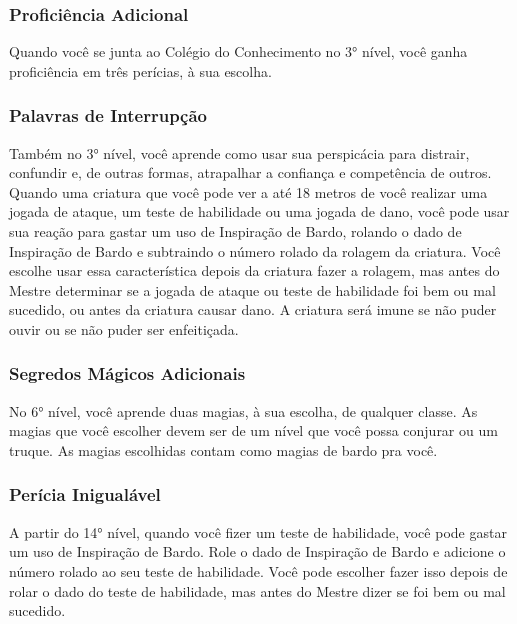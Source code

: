 \documentclass{RPG_Adventure}[2021/10/20]
\begin{document}
\subsubsection{Proficiência Adicional}%
\label{ssub:proficiencia_adicional}

Quando você se junta ao Colégio do Conhecimento no 3° nível, você ganha
proficiência em três perícias, à sua escolha.

\subsubsection{Palavras de Interrupção}%
\label{ssub:palavras_de_interrupcao}

Também no 3° nível, você aprende como usar sua perspicácia para distrair,
confundir e, de outras formas, atrapalhar a confiança e competência de outros.
Quando uma criatura que você pode ver a até 18 metros de você realizar uma
jogada de ataque, um teste de habilidade ou uma jogada de dano, você pode usar
sua reação para gastar um uso de Inspiração de Bardo, rolando o dado de
Inspiração de Bardo e subtraindo o número rolado da rolagem da criatura. Você
escolhe usar essa característica depois da criatura fazer a rolagem, mas antes
do Mestre determinar se a jogada de ataque ou teste de habilidade foi bem ou mal
sucedido, ou antes da criatura causar dano. A criatura será imune se não puder
ouvir ou se não puder ser enfeitiçada.

\subsubsection{Segredos Mágicos Adicionais}%
\label{ssub:segredos_magicos_adicionais}

No 6° nível, você aprende duas magias, à sua escolha, de qualquer classe. As
magias que você escolher devem ser de um nível que você possa conjurar ou um
truque. As magias escolhidas contam como magias de bardo pra você.

\subsubsection{Perícia Inigualável}%
\label{ssub:pericia_inigualavel}

A partir do 14° nível, quando você fizer um teste de habilidade, você pode
gastar um uso de Inspiração de Bardo. Role o dado de Inspiração de Bardo e
adicione o número rolado ao seu teste de habilidade. Você pode escolher fazer
isso depois de rolar o dado do teste de habilidade, mas antes do Mestre dizer se
foi bem ou mal sucedido.
\end{document}
